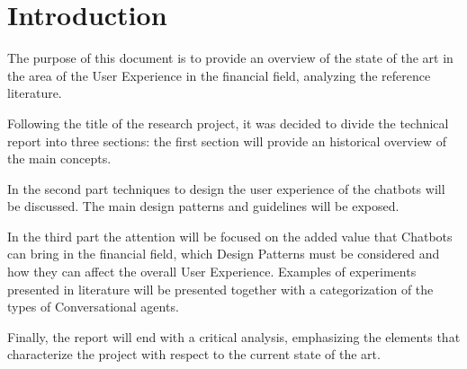 
\cleardoublepage
\chapter*{Introduction}

The purpose of this document is to provide an overview of the state of the art in the area of the User Experience in the financial field, analyzing the reference literature.

Following the title of the research project, it was decided to divide the technical report into three sections: the first section will provide an historical overview of the main concepts.

In the second part techniques to design the user experience of the chatbots will be discussed. The main design patterns and guidelines will be exposed.

In the third part the attention will be focused on the added value that Chatbots can bring in the financial field, which Design Patterns must be considered and how they can affect the overall User Experience. Examples of experiments presented in literature will be presented together with a categorization of the types of Conversational agents.

Finally, the report will end with a critical analysis, emphasizing the elements that characterize the project with respect to the current state of the art.

